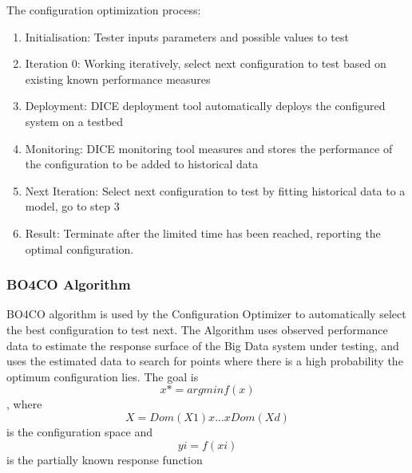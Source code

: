 The configuration optimization process: \cite{bo4co}
\begin{enumerate}
\item Initialisation: Tester inputs parameters and possible values to test
\item Iteration 0: Working iteratively, select next configuration to test based on existing known performance measures
\item Deployment: DICE deployment tool automatically deploys the configured system on a testbed
\item Monitoring: DICE monitoring tool measures and stores the performance of the configuration to be added to historical data
\item Next Iteration: Select next configuration to test by fitting historical data to a model, go to step 3
\item Result: Terminate after the limited time has been reached, reporting the optimal configuration.
\end{enumerate}

\subsubsection{BO4CO Algorithm}
BO4CO algorithm \cite{bo4co} is used by the Configuration Optimizer to automatically select the best configuration to test next. The Algorithm uses observed performance data to estimate the response surface of the Big Data system under testing, and uses the estimated data to search for points where there is a high probability the optimum configuration lies.
The goal is $$x* = argmin f(x)$$,
where $$X = Dom(X1) x ... x Dom(Xd)$$ is the configuration space
and $$yi = f(xi)$$ is the partially known response function

